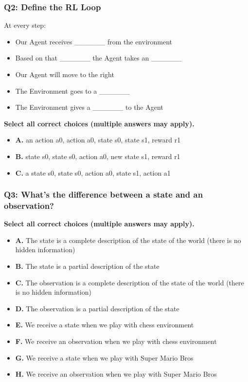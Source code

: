 \documentclass[11pt,a4paper]{article}
\begin{document}
\subsubsection{Q2: Define the RL Loop}\label{q2-define-the-rl-loop}


At every step:

\begin{itemize}
\tightlist
\item
  Our Agent receives \_\_\_\_\_\_ from the environment
\item
  Based on that \_\_\_\_\_\_ the Agent takes an \_\_\_\_\_\_
\item
  Our Agent will move to the right
\item
  The Environment goes to a \_\_\_\_\_\_
\item
  The Environment gives a \_\_\_\_\_\_ to the Agent
\end{itemize}

\textbf{Select all correct choices (multiple answers may apply).}

\begin{itemize}
\tightlist
\item
  \textbf{A.} an action a0, action a0, state s0, state s1, reward r1
\item
  \textbf{B.} state s0, state s0, action a0, new state s1, reward r1
\item
  \textbf{C.} a state s0, state s0, action a0, state s1, action a1
\end{itemize}

\subsubsection{Q3: What's the difference between a state and an observation?}\label{q3-whats-the-difference-between-a-state-and-an-observation}

\textbf{Select all correct choices (multiple answers may apply).}

\begin{itemize}
\tightlist
\item
  \textbf{A.} The state is a complete description of the state of the world (there is no hidden information)
\item
  \textbf{B.} The state is a partial description of the state
\item
  \textbf{C.} The observation is a complete description of the state of the world (there is no hidden information)
\item
  \textbf{D.} The observation is a partial description of the state
\item
  \textbf{E.} We receive a state when we play with chess environment
\item
  \textbf{F.} We receive an observation when we play with chess environment
\item
  \textbf{G.} We receive a state when we play with Super Mario Bros
\item
  \textbf{H.} We receive an observation when we play with Super Mario Bros
\end{itemize}
\end{document}
